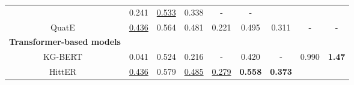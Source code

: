 \documentclass[sigconf]{acmart}
\begin{document}
\begin{table*}[htbp!]
{\begin{tabular}{c|rrr|rrr|rr}
            &\multicolumn{1}{c}{0.241} 
            &\multicolumn{1}{c}{\underline{0.533}}
            & \multicolumn{1}{c|}{{0.338}} 
            


            
           &\multicolumn{1}{c}{-} 
           & \multicolumn{1}{c}{-} \\
            
            \multicolumn{1}{c|}{QuatE~\cite{QuatE}}
            & \multicolumn{1}{c}{\underline{0.436}} 
            & \multicolumn{1}{c}{0.564}
            & \multicolumn{1}{c|}{{0.481}}
              
            &\multicolumn{1}{c}{0.221} 
            &\multicolumn{1}{c}{0.495}
            & \multicolumn{1}{c|}{0.311} 
            


            
           &\multicolumn{1}{c}{-} 
           & \multicolumn{1}{c}{-} \\
           
          \midrule
          
          \multicolumn{1}{c}{\textbf{Transformer-based models}} 
            & \multicolumn{1}{c}{} 
            & \multicolumn{1}{c}{} 
            & \multicolumn{1}{c}{}
            
           &\multicolumn{1}{c}{} 
           &\multicolumn{1}{c}{}
           & \multicolumn{1}{c}{} 
           


           
           &\multicolumn{1}{c}{} 
           & \multicolumn{1}{c}{} \\
           
           \midrule
             \multicolumn{1}{c|}{KG-BERT~\cite{KG-BERT}}
             & \multicolumn{1}{c}{0.041} 
             & \multicolumn{1}{c}{0.524} 
             & \multicolumn{1}{c|}{0.216}
             
             &\multicolumn{1}{c}{-} 
           &\multicolumn{1}{c}{0.420} 
           & \multicolumn{1}{c|}{-}
           


           
           &\multicolumn{1}{c}{0.990} 
           & \multicolumn{1}{c}{\textbf{1.47}} \\
             \multicolumn{1}{c|}{HittER~\cite{HittER}} 
             &\multicolumn{1}{c}{\underline{0.436}} 
          &\multicolumn{1}{c}{0.579} 
          & \multicolumn{1}{c|}{\underline{0.485}}
           
            &\multicolumn{1}{c}{\underline{0.279}} 
          &\multicolumn{1}{c}{\textbf{0.558}}
          & \multicolumn{1}{c|}{\textbf{0.373}} 
          



\end{tabular}}
\end{table*}
\end{document}
